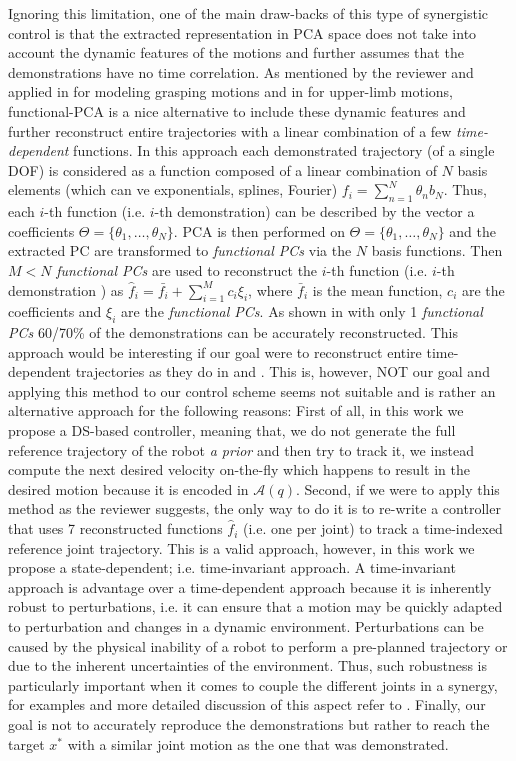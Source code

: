 \documentclass{article}
\begin{document}
\begin{enumerate}
Ignoring this limitation, one of the main draw-backs of this type of synergistic control is that the extracted representation in PCA space does not take into account the dynamic features of the motions and further assumes that the demonstrations have no time correlation. As mentioned by the reviewer and applied in \cite{Dai:IROS:2013} for modeling grasping motions and in \cite{Averta:FRAI:2017} for upper-limb motions, functional-PCA is a nice alternative to include these dynamic features and further reconstruct entire trajectories with a linear combination of a few \textit{time-dependent} functions. In this approach each demonstrated trajectory (of a single DOF) is considered as a function composed of a linear combination of $N$ basis elements (which can ve exponentials, splines, Fourier) $f_i = \sum\limits_{n=1}^{N}\theta_nb_N$. Thus, each $i$-th function (i.e. $i$-th demonstration) can be described by the vector a coefficients $\Theta = \{\theta_1,\dots,\theta_N\}$. PCA is then performed on $\Theta = \{\theta_1,\dots,\theta_N\}$ and the extracted PC are transformed to \textit{functional PCs} via the $N$ basis functions. Then $M<N$ \textit{functional PCs} are used to reconstruct the $i$-th function (i.e. $i$-th demonstration ) as $\hat{f}_i = \bar{f_i} + \sum\limits_{i=1}^{M}c_i\xi_i$, where $\bar{f}_i$ is the mean function, $c_i$ are the coefficients and $\xi_i$ are the \textit{functional PCs}. As shown in \cite{Averta:FRAI:2017} with only 1 \textit{functional PCs} 60/70\% of the demonstrations can be accurately reconstructed. This approach would be interesting if our goal were to reconstruct entire time-dependent trajectories as they do in  \cite{Dai:IROS:2013} and \cite{Averta:FRAI:2017}. This is, however, NOT our goal and applying this method to our control scheme seems not suitable and is rather an alternative approach for the following reasons: First of all, in this work we propose a DS-based controller, meaning that, we do not generate the full reference trajectory of the robot \textit{a prior} and then try to track it, we instead compute the next desired velocity on-the-fly which happens to result in the desired motion because it is encoded in $\mathcal{A}(q)$. Second, if we were to apply this method as the reviewer suggests, the only way to do it is to re-write a controller that uses 7 reconstructed functions $\hat{f}_i$ (i.e. one per joint) to track a time-indexed reference joint trajectory. This is a valid approach, however, in this work we propose a state-dependent; i.e. time-invariant approach. A time-invariant approach is advantage over a time-dependent approach because it is inherently robust to  perturbations,  i.e.  it can ensure that a  motion may be quickly adapted to perturbation and changes in a dynamic environment. Perturbations can be caused by the physical inability of a robot to perform a pre-planned trajectory or due to the inherent uncertainties of the environment. Thus, such robustness is particularly important when it comes to couple the different joints in a synergy, for examples and more detailed discussion of this aspect refer to \cite{EPFL-ARTICLE-148817}. Finally, our goal is not to accurately reproduce the demonstrations but rather to reach the target $x^*$ with a similar joint motion as the one that was demonstrated.

\end{enumerate}
\end{document}

